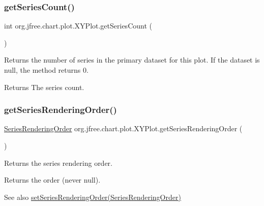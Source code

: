 \subsubsection{\texorpdfstring{get\+Series\+Count()}{getSeriesCount()}}
{\footnotesize\ttfamily int org.\+jfree.\+chart.\+plot.\+X\+Y\+Plot.\+get\+Series\+Count (\begin{DoxyParamCaption}{ }\end{DoxyParamCaption})}

Returns the number of series in the primary dataset for this plot. If the dataset is {\ttfamily null}, the method returns 0.

\begin{DoxyReturn}{Returns}
The series count. 
\end{DoxyReturn}
\mbox{\label{classorg_1_1jfree_1_1chart_1_1plot_1_1_x_y_plot_a1a743a03a79a8f5c1cc42bb245057e55}} 
\subsubsection{\texorpdfstring{get\+Series\+Rendering\+Order()}{getSeriesRenderingOrder()}}
{\footnotesize\ttfamily \mbox{\hyperlink{classorg_1_1jfree_1_1chart_1_1plot_1_1_series_rendering_order}{Series\+Rendering\+Order}} org.\+jfree.\+chart.\+plot.\+X\+Y\+Plot.\+get\+Series\+Rendering\+Order (\begin{DoxyParamCaption}{ }\end{DoxyParamCaption})}

Returns the series rendering order.

\begin{DoxyReturn}{Returns}
the order (never {\ttfamily null}).
\end{DoxyReturn}
\begin{DoxySeeAlso}{See also}
\mbox{\hyperlink{classorg_1_1jfree_1_1chart_1_1plot_1_1_x_y_plot_a4e8fd233186ffd56cf481ca55e1d6906}{set\+Series\+Rendering\+Order(\+Series\+Rendering\+Order)}} 
\end{DoxySeeAlso}
\mbox{\label{classorg_1_1jfree_1_1chart_1_1plot_1_1_x_y_plot_afbe6ac8a95eb7c0907d48dcddbf1ae3e}} 
